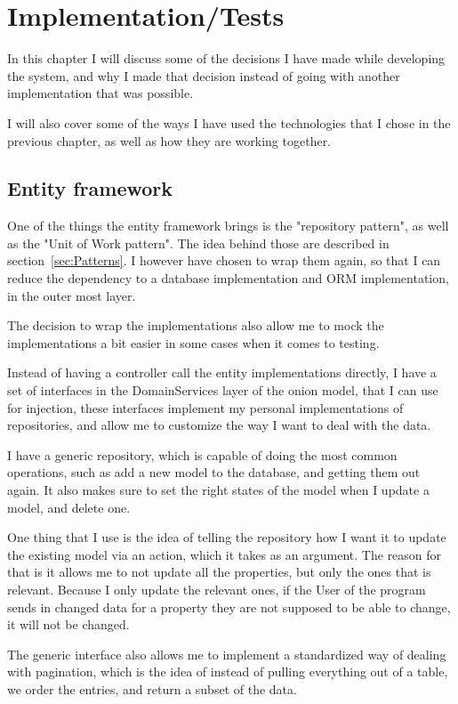 \chapter{Implementation/Tests}
\label{chap:Implementation}

In this chapter I will discuss some of the decisions I have made while developing the system, and why I made that decision instead of going with another implementation that was possible.

I will also cover some of the ways I have used the technologies that I chose in the previous chapter, as well as how they are working together.

\section{Entity framework}
\label{sec:Entity framework}
One of the things the entity framework brings is the "repository pattern", as well as the "Unit of Work pattern". The idea behind those are described in section~\ref{sec:Patterns}. I however have chosen to wrap them again, so that I can reduce the dependency to a database implementation and ORM implementation, in the outer most layer.

The decision to wrap the implementations also allow me to mock the implementations a bit easier in some cases when it comes to testing.

Instead of having a controller call the entity implementations directly, I have a set of interfaces in the DomainServices layer of the onion model, that I can use for injection, these interfaces implement my personal implementations of repositories, and allow me to customize the way I want to deal with the data.

I have a generic repository, which is capable of doing the most common operations, such as add a new model to the database, and getting them out again. It also makes sure to set the right states of the model when I update a model, and delete one.

One thing that I use is the idea of telling the repository how I want it to update the existing model via an action, which it takes as an argument. The reason for that is it allows me to not update all the properties, but only the ones that is relevant. Because I only update the relevant ones, if the User of the program sends in changed data for a property they are not supposed to be able to change, it will not be changed.

The generic interface also allows me to implement a standardized way of dealing with pagination, which is the idea of instead of pulling everything out of a table, we order the entries, and return a subset of the data.

